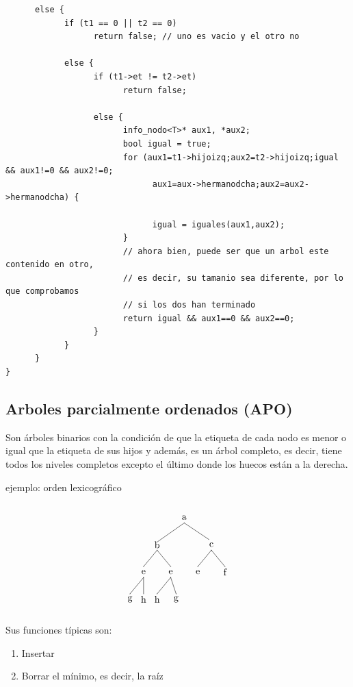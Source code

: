 \documentclass[10pt,a4paper,spanish]{report}
\begin{document}
\begin{verbatim}
      else {
            if (t1 == 0 || t2 == 0)
                  return false; // uno es vacio y el otro no

            else {
                  if (t1->et != t2->et)
                        return false;

                  else {
                        info_nodo<T>* aux1, *aux2;
                        bool igual = true;
                        for (aux1=t1->hijoizq;aux2=t2->hijoizq;igual && aux1!=0 && aux2!=0;
                              aux1=aux->hermanodcha;aux2=aux2->hermanodcha) {

                              igual = iguales(aux1,aux2);
                        }
                        // ahora bien, puede ser que un arbol este contenido en otro,
                        // es decir, su tamanio sea diferente, por lo que comprobamos
                        // si los dos han terminado
                        return igual && aux1==0 && aux2==0;
                  }
            }
      }
}
\end{verbatim}

\subsection{\textcolor[rgb]{0.3,0.4,0.8}Arboles parcialmente ordenados (APO)}
\noindent
Son árboles binarios con la condición de que la etiqueta de cada nodo es menor o igual que la etiqueta de sus hijos y además, es un árbol completo, es decir, tiene todos los niveles completos excepto el último donde los huecos están a la derecha.

\noindent
ejemplo: orden lexicográfico

\[\begin{xy}
,(0,0)*+=<10mm>[]\txt<2cm>{a}
,(-10,-10)*+=<10mm>[]\txt<2cm>{b}
,(10,-10)*+=<10mm>[]\txt<2cm>{c}
,(-15,-20)*+=<10mm>[]\txt<2cm>{e}
,(-5,-20)*+=<10mm>[]\txt<2cm>{e}
,(5,-20)*+=<10mm>[]\txt<2cm>{e}
,(15,-20)*+=<10mm>[]\txt<2cm>{f}
,(-20,-30)*+=<10mm>[]\txt<2cm>{g}
,(-15,-30)*+=<10mm>[]\txt<2cm>{h}
,(-10,-30)*+=<10mm>[]\txt<2cm>{h}
,(-3,-30)*+=<10mm>[]\txt<2cm>{g}

\ar@{-} (0,-2);(-10,-9)
\ar@{-} (0,-2);(9,-8)
\ar@{-} (-10,-12);(-15,-18)
\ar@{-} (10,-12);(5,-18)
\ar@{-} (10,-12);(15,-18)
\ar@{-} (-15,-22);(-20,-28)
\ar@{-} (-15,-22);(-15,-28)
\ar@{-} (-10,-12);(-5,-18)
\ar@{-} (-5,-22);(-10,-28)
\ar@{-} (-5,-22);(-3,-28)
\end{xy}\]

\noindent
Sus funciones típicas son:
\begin{enumerate}[---]
      \item Insertar
      \item Borrar el mínimo, es decir, la raíz
\end{enumerate}
\end{document}
